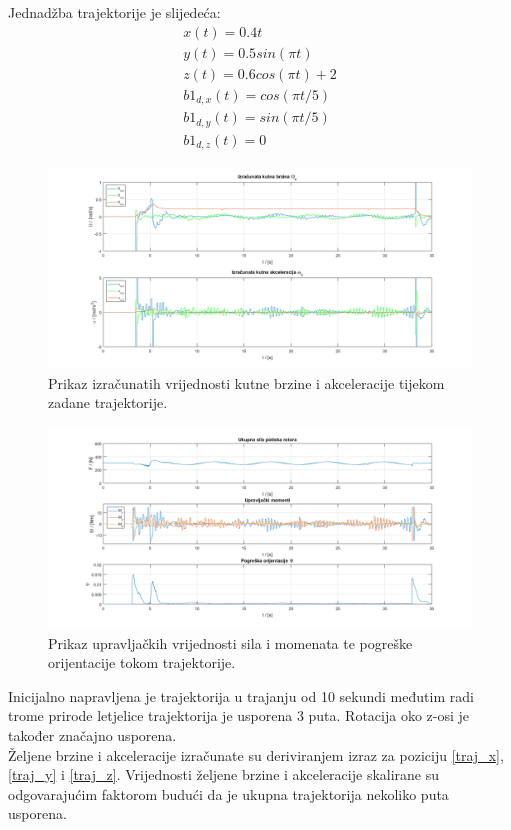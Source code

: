 \documentclass[times, utf8, diplomski]{fer}
\begin{document}
	Jednadžba trajektorije je slijedeća:
	\begin{gather}
		x(t) = 0.4t \label{traj_x}\\
		y(t) = 0.5 sin(\pi t) \label{traj_y}\\
		z(t) = 0.6 cos(\pi t) + 2 \label{traj_z}\\
		b1_{d,x}(t) = cos(\pi t / 5) \\
		b1_{d,y}(t) = sin(\pi t / 5) \\
		b1_{d,z}(t) = 0
	\end{gather}
	\begin{figure}[h!]
		\includegraphics[width=\textwidth]{plots/traj_alpha_omega2.png}
		\caption{Prikaz izračunatih vrijednosti kutne brzine i akceleracije tijekom zadane trajektorije.}
	\end{figure}
	
	\begin{figure}[h!]
		\includegraphics[width=\textwidth]{plots/traj_force_moments2.png}
		\caption{Prikaz upravljačkih vrijednosti sila i momenata te pogreške orijentacije tokom trajektorije.}
	\end{figure}
	
	Inicijalno napravljena je trajektorija u trajanju od 10 sekundi međutim radi trome prirode letjelice trajektorija je usporena 3 puta. Rotacija oko z-osi je također značajno usporena.\\
	Željene brzine i akceleracije izračunate su deriviranjem izraz za poziciju \ref{traj_x}, \ref{traj_y} i \ref{traj_z}. Vrijednosti željene brzine i akceleracije skalirane su odgovarajućim faktorom budući da je ukupna trajektorija nekoliko puta usporena.
	
\end{document}
